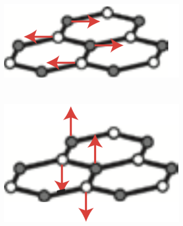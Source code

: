 \begin{figure}[!h]
  \centering
  \begin{subfigure}{0.3\textwidth}
    \includegraphics[width=\textwidth]{./images/g-mode-phonon.png}
  \end{subfigure}
  ~
  \begin{subfigure}{0.3\textwidth}
    \includegraphics[width=\textwidth]{./images/g-mode-phonon-2.png}
  \end{subfigure}
  \begin{subfigure}{0.3\textwidth}

\end{subfigure}
\end{figure}
